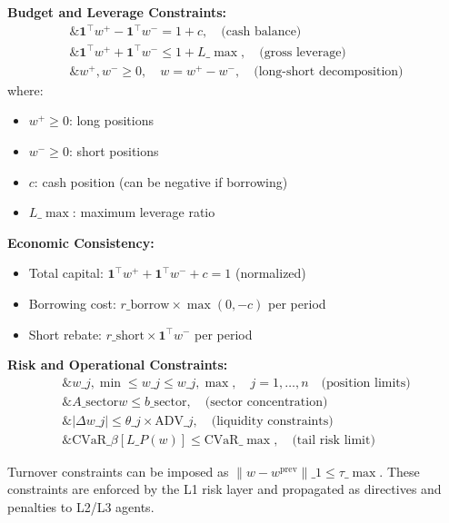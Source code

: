 \documentclass[11pt,a4paper]{article}
\begin{document}
\textbf{Budget and Leverage Constraints:}
\begin{equation}
\begin{aligned}
\&\mathbf{1}^\top w^+ - \mathbf{1}^\top w^- = 1 + c, \quad \text{(cash balance)}\\
\&\mathbf{1}^\top w^+ + \mathbf{1}^\top w^- \leq 1 + L\_{\max}, \quad \text{(gross leverage)}\\
\&w^+, w^- \geq 0, \quad w = w^+ - w^-, \quad \text{(long-short decomposition)}
\end{aligned}
\end{equation}
where:
\begin{itemize}
\item $w^+ \geq 0$: long positions
\item $w^- \geq 0$: short positions  
\item $c$: cash position (can be negative if borrowing)
\item $L\_{\max}$: maximum leverage ratio

\end{itemize}
\textbf{Economic Consistency:}
\begin{itemize}
\item Total capital: $\mathbf{1}^\top w^+ + \mathbf{1}^\top w^- + c = 1$ (normalized)
\item Borrowing cost: $r\_{\text{borrow}} \times \max(0, -c)$ per period
\item Short rebate: $r\_{\text{short}} \times \mathbf{1}^\top w^-$ per period

\end{itemize}
\textbf{Risk and Operational Constraints:}
\begin{equation}
\begin{aligned}
\&w\_{j,\min} \leq w\_j \leq w\_{j,\max}, \quad j = 1,\ldots,n\quad \text{(position limits)}\\
\&A\_{\text{sector}} w \leq b\_{\text{sector}}, \quad \text{(sector concentration)}\\
\&|\Delta w\_j| \leq \theta\_j \times \text{ADV}\_j, \quad \text{(liquidity constraints)}\\
\&\text{CVaR}\_{\beta}[L\_P(w)] \leq \text{CVaR}\_{\max}, \quad \text{(tail risk limit)}
\end{aligned}
\end{equation}

Turnover constraints can be imposed as $\|w-w^{\text{prev}}\|\_1 \le \tau\_{\max}$. These constraints are enforced by the L1 risk layer and propagated as directives and penalties to L2/L3 agents.
\end{document}

